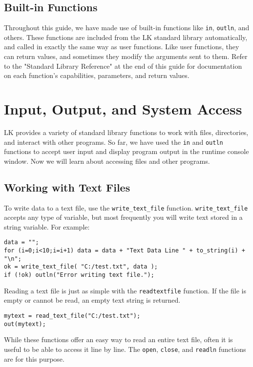 \documentclass{article}
\begin{document}
\subsection{Built-in Functions}

Throughout this guide, we have made use of built-in functions like \texttt{in}, \texttt{outln}, and others.  These functions are included from the LK standard library automatically, and called in exactly the same way as user functions.  Like user functions, they can return values, and sometimes they modify the arguments sent to them.  Refer to the "Standard Library Reference" at the end of this guide for documentation on each function's capabilities, parameters, and return values.

\section{Input, Output, and System Access}

LK provides a variety of standard library functions to work with files, directories, and interact with other programs.  So far, we have used the \texttt{in} and \texttt{outln} functions to accept user input and display program output in the runtime console window.  Now we will learn about accessing files and other programs.

\subsection{Working with Text Files}

To write data to a text file, use the \texttt{write\_text\_file} function.  \texttt{write\_text\_file} accepts any type of variable, but most frequently you will write text stored in a string variable.  For example:

\begin{verbatim}
data = "";
for (i=0;i<10;i=i+1) data = data + "Text Data Line " + to_string(i) + "\n";
ok = write_text_file( "C:/test.txt", data );
if (!ok) outln("Error writing text file.");
\end{verbatim}

Reading a text file is just as simple with the \texttt{readtextfile} function.  If the file is empty or cannot be read, an empty text string is returned.

\begin{verbatim}
mytext = read_text_file("C:/test.txt");
out(mytext);
\end{verbatim}

While these functions offer an easy way to read an entire text file, often it is useful to be able to access it line by line.  The \texttt{open}, \texttt{close}, and \texttt{readln} functions are for this purpose. 
\end{document}
